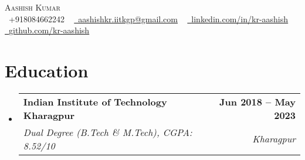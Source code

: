 \documentclass[letterpaper,11pt]{article}
\makeatletter
\newcommand{\resumeSubheading}[4]{
  \vspace{-2pt}\item
    \begin{tabular*}{1.0\textwidth}[t]{l@{\extracolsep{\fill}}r}
      \textbf{#1} & \textbf{\small #2} \\
      \textit{\small#3} & \textit{\small #4} \\
    \end{tabular*}\vspace{-7pt}
}
\newcommand{\resumeSubHeadingListStart}{\begin{itemize}[leftmargin=0.0in, label={}]}
\newcommand{\resumeSubHeadingListEnd}{\end{itemize}}
\makeatother
\begin{document}

\begin{center}
    {\Huge \scshape Aashish Kumar} \\ \vspace{1pt}
    \small \raisebox{-0.1\height}\faPhone\ +918084662242 ~ \href{mailto:aashishkr.iitkgp@gmail.com}{\raisebox{-0.2\height}\faEnvelope\  \underline{aashishkr.iitkgp@gmail.com}} ~ 
    \href{https://www.linkedin.com/in/kr-aashish/}{\raisebox{-0.2\height}\faLinkedin\ \underline{linkedin.com/in/kr-aashish}}  ~
    \href{https://github.com/kr-aashish}{\raisebox{-0.2\height}\faGithub\ \underline{github.com/kr-aashish}}
    \vspace{-8pt}
\end{center}


\section{Education}
  \resumeSubHeadingListStart
    \resumeSubheading
      {Indian Institute of Technology Kharagpur}{Jun 2018 -- May 2023}
      {Dual Degree (B.Tech \& M.Tech), CGPA: 8.52/10}{Kharagpur}
  \resumeSubHeadingListEnd


\end{document}
